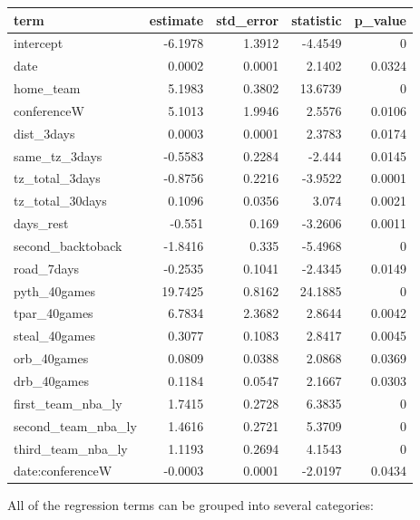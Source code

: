 \documentclass[
    12pt,
    a4paper,
    titlepage,  %
    abstract,  %
    headings=standardclasses,  %
    bibliography=totocnumbered  %
]{scrartcl}
\begin{document}
\begingroup
    \ttfamily
    \begin{longtable}{|l|r|r|r|r|}
        \hline
        \textbf{term} & \textbf{estimate} & \textbf{std\_error} & \textbf{statistic} & \textbf{p\_value} \\ \hline
        \endhead
        intercept & -6.1978 & 1.3912 & -4.4549 & 0 \\ \hline
        date & 0.0002 & 0.0001 & 2.1402 & 0.0324 \\ \hline
        home\_team & 5.1983 & 0.3802 & 13.6739 & 0 \\ \hline
        conferenceW & 5.1013 & 1.9946 & 2.5576 & 0.0106 \\ \hline
        dist\_3days & 0.0003 & 0.0001 & 2.3783 & 0.0174 \\ \hline
        same\_tz\_3days & -0.5583 & 0.2284 & -2.444 & 0.0145 \\ \hline
        tz\_total\_3days & -0.8756 & 0.2216 & -3.9522 & 0.0001 \\ \hline
        tz\_total\_30days & 0.1096 & 0.0356 & 3.074 & 0.0021 \\ \hline
        days\_rest & -0.551 & 0.169 & -3.2606 & 0.0011 \\ \hline
        second\_backtoback & -1.8416 & 0.335 & -5.4968 & 0 \\ \hline
        road\_7days & -0.2535 & 0.1041 & -2.4345 & 0.0149 \\ \hline
        pyth\_40games & 19.7425 & 0.8162 & 24.1885 & 0 \\ \hline
        tpar\_40games & 6.7834 & 2.3682 & 2.8644 & 0.0042 \\ \hline
        steal\_40games & 0.3077 & 0.1083 & 2.8417 & 0.0045 \\ \hline
        orb\_40games & 0.0809 & 0.0388 & 2.0868 & 0.0369 \\ \hline
        drb\_40games & 0.1184 & 0.0547 & 2.1667 & 0.0303 \\ \hline
        first\_team\_nba\_ly & 1.7415 & 0.2728 & 6.3835 & 0 \\ \hline
        second\_team\_nba\_ly & 1.4616 & 0.2721 & 5.3709 & 0 \\ \hline
        third\_team\_nba\_ly & 1.1193 & 0.2694 & 4.1543 & 0 \\ \hline
        date:conferenceW & -0.0003 & 0.0001 & -2.0197 & 0.0434 \\ \hline
    \end{longtable}
\endgroup

All of the regression terms can be grouped into several categories:
\end{document}
